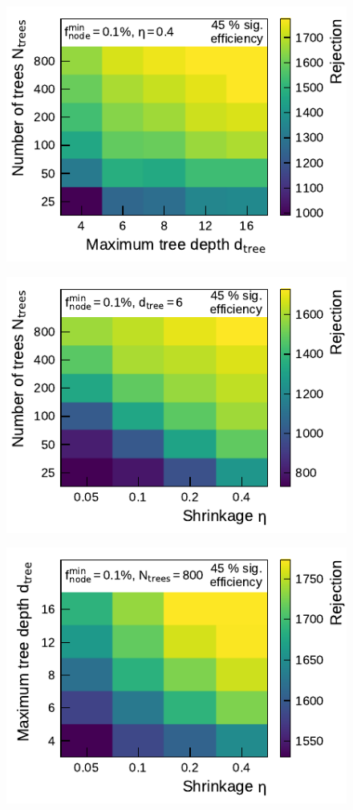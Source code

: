 \noindent
\begin{minipage}{\textwidth}
  \captionsetup{type=figure}
  \begin{subfigure}[t]{0.48\textwidth}
    \centering
    \includegraphics{./figures/bdt_perf/gridsearch_3p/scan_MaxDepth_NTrees.pdf}
  \end{subfigure}\hfill
  \begin{subfigure}[t]{0.48\textwidth}
    \centering
    \includegraphics{./figures/bdt_perf/gridsearch_3p/scan_Shrinkage_NTrees.pdf}
  \end{subfigure}
  \begin{subfigure}[t]{0.48\textwidth}
    \centering
    \includegraphics{./figures/bdt_perf/gridsearch_3p/scan_Shrinkage_MaxDepth.pdf}

\end{subfigure}
\end{minipage}
